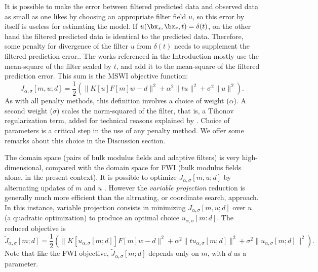 It is possible to make the error between filtered predicted data and
observed data as small as one likes by choosing an appropriate filter
field $u$, so this error by itself is useless for estimating the
model. If $u(\bx_s,\bx_r,t)=\delta(t)$, on the other hand the filtered
predicted data is identical to the predicted data.
Therefore, some penalty for divergence of the filter $u$ from
$\delta(t)$ needs to supplement the filtered prediction error.. The works referenced in the Introduction mostly use the
mean-square of the filter scaled by $t$, and add it to the mean-square
of the filtered prediction error. This sum is the MSWI objective function:
\begin{equation}
  \label{eqn:filtpen}
  J_{\alpha,\sigma}[m,u;d]=\frac{1}{2}(\|K[u]F[m]w-d\|^2
  +\alpha^2\|tu\|^2 + \sigma^2\|u\|^2).
\end{equation}
As with all penalty methods, this definition involves a choice of
weight ($\alpha$). A second weight ($\sigma$) scales the norm-squared
of the filter, that is, a Tihonov regularization term, added for
technical reasons explained by \cite{Warner:16,Symes:24a}. Choice of
parameters is a critical step in the use of any penalty method. We
offer some remarks about this choice in the Discussion section.

The domain space (pairs of bulk modulus fields and adaptive filters)
is very high-dimensional, compared with the domain space for FWI (bulk
modulus fields alone, in the present context). It is possible to
optimize $J_{\alpha,\sigma}[m,u;d]$ by alternating updates of $m$ and
$u$  \cite[]{LiAlkhalifah:21}. However the {\em variable projection} \cite[]{GolubPereyra:73,GolubPereyra:03}
reduction is generally much more efficient than the altrnating, or
coordinate search, approach. In this instance, variable projection
consists in minimizing $J_{\alpha,\sigma}[m,u;d]$ over $u$ (a
quadratic optimization) to produce an optimal choice
$u_{\alpha,\sigma}[m:d]$. The reduced objective is
\begin{equation}
  \label{eqn:redfiltpen}
  \tilde{J}_{\alpha,\sigma}[m;d]=\frac{1}{2}(\|K[u_{\alpha,\sigma}[m;d]]F[m]w-d\|^2
  +\alpha^2\|tu_{\alpha,\sigma}[m;d]\|^2 + \sigma^2\|u_{\alpha,\sigma}[m;d]\|^2).
\end{equation}
Note that like the FWI objective, $\tilde{J}_{\alpha,\sigma}[m;d]$
depends only on $m$, with $d$ as a parameter.

